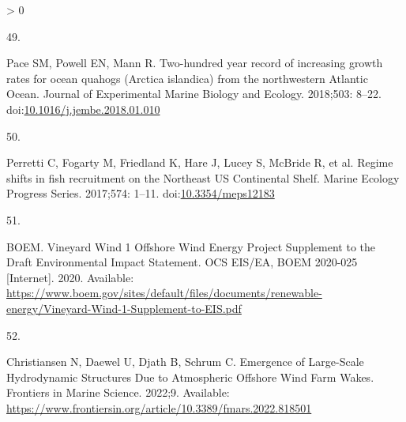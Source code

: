\documentclass[
  10pt,
]{article}
\newlength{\cslhangindent}
\newlength{\csllabelwidth}
\newenvironment{CSLReferences}[2] %
 {%
  \setlength{\parindent}{0pt}
  \ifodd #1 \everypar{\setlength{\hangindent}{\cslhangindent}}\ignorespaces\fi
  \ifnum #2 > 0
  \setlength{\parskip}{#2\baselineskip}
  \fi
 }%
 {}
\newcommand{\CSLLeftMargin}[1]{\parbox[t]{\csllabelwidth}{#1}}
\newcommand{\CSLRightInline}[1]{\parbox[t]{\linewidth - \csllabelwidth}{#1}\break}
\begin{document}
\begin{CSLReferences}{0}{0}
\leavevmode\hypertarget{ref-pace_two-hundred_2018}{}%
\CSLLeftMargin{49. }
\CSLRightInline{Pace SM, Powell EN, Mann R. Two-hundred year record of
increasing growth rates for ocean quahogs ({Arctica} islandica) from the
northwestern {Atlantic} {Ocean}. Journal of Experimental Marine Biology
and Ecology. 2018;503: 8--22.
doi:\href{https://doi.org/10.1016/j.jembe.2018.01.010}{10.1016/j.jembe.2018.01.010}}

\leavevmode\hypertarget{ref-perretti_regime_2017}{}%
\CSLLeftMargin{50. }
\CSLRightInline{Perretti C, Fogarty M, Friedland K, Hare J, Lucey S,
McBride R, et al. Regime shifts in fish recruitment on the {Northeast}
{US} {Continental} {Shelf}. Marine Ecology Progress Series. 2017;574:
1--11. doi:\href{https://doi.org/10.3354/meps12183}{10.3354/meps12183}}

\leavevmode\hypertarget{ref-boem_vineyard_2020}{}%
\CSLLeftMargin{51. }
\CSLRightInline{BOEM. Vineyard {Wind} 1 {Offshore} {Wind} {Energy}
{Project} {Supplement} to the {Draft} {Environmental} {Impact}
{Statement}. {OCS} {EIS}/{EA}, {BOEM} 2020-025 {[}Internet{]}. 2020.
Available:
\url{https://www.boem.gov/sites/default/files/documents/renewable-energy/Vineyard-Wind-1-Supplement-to-EIS.pdf}}

\leavevmode\hypertarget{ref-christiansen_emergence_2022}{}%
\CSLLeftMargin{52. }
\CSLRightInline{Christiansen N, Daewel U, Djath B, Schrum C. Emergence
of {Large}-{Scale} {Hydrodynamic} {Structures} {Due} to {Atmospheric}
{Offshore} {Wind} {Farm} {Wakes}. Frontiers in Marine Science. 2022;9.
Available:
\url{https://www.frontiersin.org/article/10.3389/fmars.2022.818501}}

\end{CSLReferences}
\end{document}

